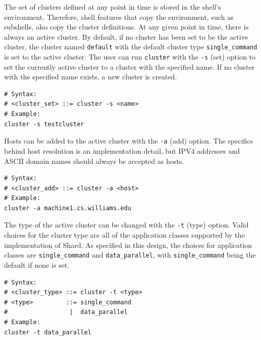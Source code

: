 \documentclass[oneside]{report}
\begin{document}
The set of clusters defined at any point in time is stored in the shell's environment.
Therefore, shell features that copy the environment, such as subshells, also copy the cluster definitions.
At any given point in time, there is always an active cluster.
By default, if no cluster has been set to be the active cluster, the cluster named \texttt{default} with the default cluster type \texttt{single\_command} is set to the active cluster.
The user can run \texttt{cluster} with the \texttt{-s} (set) option to set the currently active cluster to a cluster with the specified name.
If no cluster with the specified name exists, a new cluster is created.

\begin{minipage}[c]{\textwidth-15pt}
  \begin{lstlisting}[language=Shard]
# Syntax:
# <cluster_set> ::= cluster -s <name>
# Example:
cluster -s testcluster
\end{lstlisting}
  \smallskip
\end{minipage}

Hosts can be added to the active cluster with the \texttt{-a} (add) option.
The specifics behind host resolution is an implementation detail, but IPV4 addresses and ASCII domain names should always be accepted as hosts.

\begin{minipage}[c]{\textwidth-15pt}
  \begin{lstlisting}[language=Shard]
# Syntax:
# <cluster_add> ::= cluster -a <host>
# Example:
cluster -a machine1.cs.williams.edu
\end{lstlisting}
  \smallskip
\end{minipage}

The type of the active cluster can be changed with the \texttt{-t} (type) option.
Valid choices for the cluster type are all of the application classes supported by the implementation of Shard.
As specified in this design, the choices for application classes are \texttt{single\_command} and \texttt{data\_parallel}, with \texttt{single\_command} being the default if none is set.

\begin{minipage}[c]{\textwidth-15pt}
  \begin{lstlisting}[language=Shard]
# Syntax:
# <cluster_type> ::= cluster -t <type>
# <type>         ::= single_command
#                 |  data_parallel
# Example:
cluster -t data_parallel
\end{lstlisting}
  \smallskip
\end{minipage}
\end{document}
